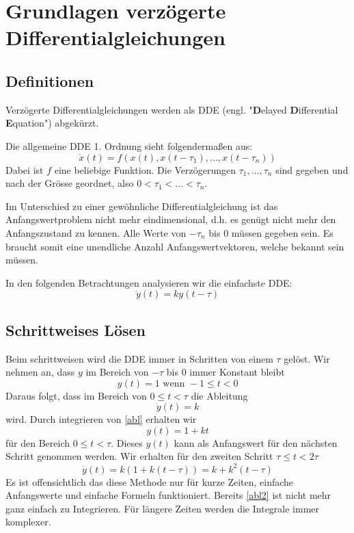 %
%
%
\section{Grundlagen verzögerte Differentialgleichungen}
\subsection{Definitionen}
Verzögerte Differentialgleichungen werden als DDE (engl. "\textbf{D}elayed \textbf{D}ifferential \textbf{E}quation") abgekürzt.

Die allgemeine DDE 1. Ordnung sieht folgendermaßen aus:
\begin{equation}
	\dot{x}(t) = f(x(t),x(t-\tau_1),...,x(t-\tau_n))
\end{equation}
Dabei ist $f$ eine beliebige Funktion. Die Verzögerungen $\tau_1,...,\tau_n$ sind gegeben und nach der Grösse geordnet, also $0<\tau_1<...<\tau_n$.

Im Unterschied zu einer gewöhnliche Differentialgleichung ist das Anfangswertproblem nicht mehr eindimensional, d.h. es genügt nicht mehr den Anfangszustand zu kennen.
Alle Werte von $-\tau_n$ bis $0$ müssen gegeben sein. 
Es braucht somit eine unendliche Anzahl Anfangswertvektoren, welche bekannt sein müssen.

In den folgenden Betrachtungen analysieren wir die einfachste DDE:
\begin{equation}\label{bsp}
\dot{y}(t)=ky(t-\tau)
\end{equation}

\subsection{Schrittweises Lösen}
Beim schrittweisen wird die DDE immer in Schritten von einem $\tau$ gelöst.
Wir nehmen an, dass $y$ im Bereich von $-\tau$ bis $0$ immer Konstant bleibt
\begin{equation}
	y(t)=1 \text{ wenn } -1\le t<0
\end{equation}
Daraus folgt, dass im Bereich von $0\le t<\tau$ die Ableitung
\begin{equation}\label{abl}
	\dot{y}(t)=k
\end{equation}
wird. Durch integrieren von \ref{abl} erhalten wir
\begin{equation}
	y(t)=1+kt
\end{equation}
für den Bereich $0\le t<\tau$. 
Dieses $y(t)$ kann als Anfangswert für den nächsten Schritt genommen werden.
Wir erhalten für den zweiten Schritt  $\tau\le t<2\tau$ 
\begin{equation}\label{abl2}
	\dot{y}(t)=k(1+k(t-\tau))=k+k^2(t-\tau)
\end{equation}
Es ist offensichtlich das diese Methode nur für kurze Zeiten, einfache Anfangswerte und einfache Formeln funktioniert. 
Bereits \ref{abl2} ist nicht mehr ganz einfach zu Integrieren. 
Für längere Zeiten werden die Integrale immer komplexer. %

